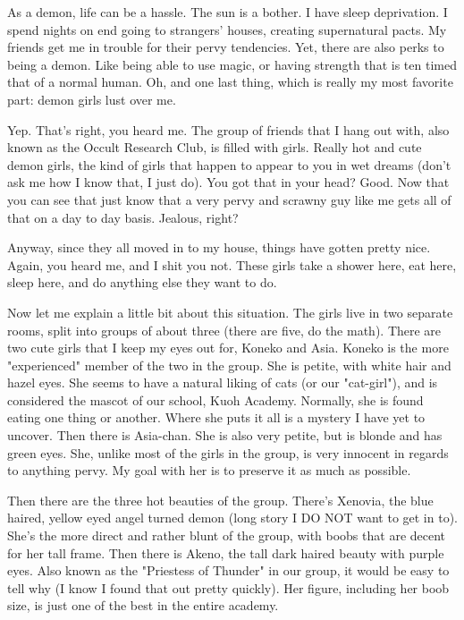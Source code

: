\documentclass{article}
\begin{document}
As a demon, life can be a hassle. The sun is a bother. I have sleep deprivation. I spend nights on end going to strangers' houses, creating supernatural pacts. My friends get me in trouble for their pervy tendencies. Yet, there are also perks to being a demon. Like being able to use magic, or having strength that is ten timed that of a normal human. Oh, and one last thing, which is really my most favorite part: demon girls lust over me.

Yep. That's right, you heard me. The group of friends that I hang out with, also known as the Occult Research Club, is filled with girls. Really hot and cute demon girls, the kind of girls that happen to appear to you in wet dreams (don't ask me how I know that, I just do). You got that in your head? Good. Now that you can see that just know that a very pervy and scrawny guy like me gets all of that on a day to day basis. Jealous, right?

Anyway, since they all moved in to my house, things have gotten pretty nice. Again, you heard me, and I shit you not. These girls take a shower here, eat here, sleep here, and do anything else they want to do.

Now let me explain a little bit about this situation. The girls live in two separate rooms, split into groups of about three (there are five, do the math). There are two cute girls that I keep my eyes out for, Koneko and Asia. Koneko is the more "experienced" member of the two in the group. She is petite, with white hair and hazel eyes. She seems to have a natural liking of cats (or our "cat-girl"), and is considered the mascot of our school, Kuoh Academy. Normally, she is found eating one thing or another. Where she puts it all is a mystery I have yet to uncover. Then there is Asia-chan. She is also very petite, but is blonde and has green eyes. She, unlike most of the girls in the group, is very innocent in regards to anything pervy. My goal with her is to preserve it as much as possible.

Then there are the three hot beauties of the group. There's Xenovia, the blue haired, yellow eyed angel turned demon (long story I DO NOT want to get in to). She's the more direct and rather blunt of the group, with boobs that are decent for her tall frame. Then there is Akeno, the tall dark haired beauty with purple eyes. Also known as the "Priestess of Thunder" in our group, it would be easy to tell why (I know I found that out pretty quickly). Her figure, including her boob size, is just one of the best in the entire academy.
\end{document}
